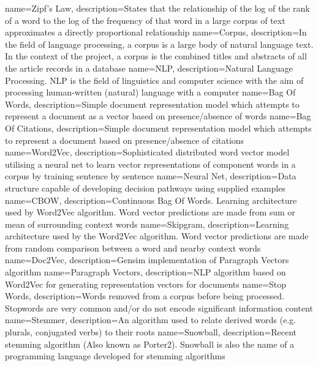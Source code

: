 {
name={Zipf's Law},
description={States that the relationship of the log of the rank of a word to the log of the frequency of that word in a large corpus of text approximates a directly proportional relationship \cite{zipf}} 
}
{
name={Corpus},
description={In the field of language processing, a corpus is a large body of natural language text. In the context of the project, a corpus is the combined titles and abstracts of all the article records in a database} 
}
{
name={NLP},
description={Natural Language Processing. NLP is the field of linguistics and computer science with the aim of processing human-written (natural) language with a computer} 
}
{
name={Bag Of Words},
description={Simple document representation model which attempts to represent a document as a vector based on presence/absence of words} 
}
{
name={Bag Of Citations},
description={Simple document representation model which attempts to represent a document based on presence/absence of citations} 
}
{
name={Word2Vec},
description={Sophisticated distributed word vector model utilising a neural net to learn vector representations of  component words in a corpus by training sentence by sentence \cite{word2vec1}\cite{word2vec2}} 
}
{
name={Neural Net},
description={Data structure capable of developing decision pathways using supplied examples} 
}
{
name={CBOW},
description={Continuous Bag Of Words. Learning architecture used by Word2Vec algorithm. Word vector predictions are made from sum or mean of surrounding context words} 
}
{
name={Skipgram},
description={Learning architecture used by the Word2Vec algorithm. Word vector predictions are made from random comparison between a word and nearby context words} 
}
{
name={Doc2Vec},
description={Gensim implementation of Paragraph Vectors algorithm} 
}
{
name={Paragraph Vectors},
description={NLP algorithm based on Word2Vec for generating representation vectors for documents} 
}
{
name={Stop Words},
description={Words removed from a corpus before being processed. Stopwords are very common and/or do not encode significant information content} 
}
{
name={Stemmer},
description={An algorithm used to relate derived words (e.g. plurals, conjugated verbs) to their roots} 
}
{
name={Snowball},
description={Recent stemming algorithm \cite{snowball}(Also known as Porter2). Snowball is also the name of a programming language developed for stemming algorithms} 
}
